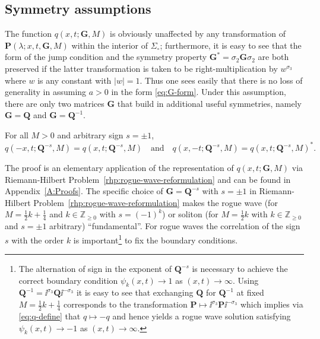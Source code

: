 \subsection{Symmetry assumptions}
The function $q(x,t;\mathbf{G},M)$ is obviously unaffected by any transformation of $\mathbf{P}(\lambda;x,t,\mathbf{G},M)$ within the interior of $\Sigma_\circ$; furthermore, it is easy to see that the form of the jump condition and the symmetry property $\mathbf{G}^*=\sigma_2\mathbf{G}\sigma_2$ are both preserved if the latter transformation is taken to be right-multiplication by $w^{\sigma_3}$ where $w$ is any constant with $|w|=1$.  Thus one sees easily that there is no loss of generality in assuming $a>0$ in the form \eqref{eq:G-form}.  Under this assumption, there are only two matrices $\mathbf{G}$ that build in additional useful symmetries, namely $\mathbf{G}=\mathbf{Q}$ and $\mathbf{G}=\mathbf{Q}^{-1}$.
\begin{proposition}
For all $M>0$ and arbitrary sign $s=\pm 1$,
\begin{equation}
q(-x,t;\mathbf{Q}^{-s},M)=q(x,t;\mathbf{Q}^{-s},M)\quad\text{and}\quad
q(x,-t;\mathbf{Q}^{-s},M)=q(x,t;\mathbf{Q}^{-s},M)^*.
\label{eq:q-symmetries}  
\end{equation}
\label{prop:symmetry}
\end{proposition}
The proof is an elementary application of the representation of $q(x,t;\mathbf{G},M)$ via Riemann-Hilbert Problem~\ref{rhp:rogue-wave-reformulation} and can be found in Appendix~\ref{A:Proofs}.
The specific choice of $\mathbf{G}=\mathbf{Q}^{-s}$ with $s=\pm 1$ in Riemann-Hilbert Problem~\ref{rhp:rogue-wave-reformulation} makes the rogue wave (for $M=\tfrac{1}{2}k+\tfrac{1}{4}$ and $k\in\mathbb{Z}_{\ge 0}$ with $s=(-1)^k$) or soliton (for $M=\tfrac{1}{2}k$ with $k\in\mathbb{Z}_{\ge 0}$ and $s=\pm 1$ arbitrary) ``fundamental''.  For rogue waves the correlation of the sign $s$ with the order $k$ is important\footnote{The alternation of sign in the exponent of $\mathbf{Q}^{-s}$ is necessary to achieve the correct boundary condition $\psi_k(x,t)\to 1$ as $(x,t)\to\infty$.  Using $\mathbf{Q}^{-1}=\ii^{\sigma_3}\mathbf{Q}\ii^{-\sigma_3}$ it is easy to see that exchanging $\mathbf{Q}$ for $\mathbf{Q}^{-1}$ at fixed $M=\tfrac{1}{2}k+\tfrac{1}{4}$ corresponds to the transformation $\mathbf{P}\mapsto \ii^{\sigma_3}\mathbf{P}\ii^{-\sigma_3}$ which implies via \eqref{eq:q-define} that $q\mapsto -q$ and hence yields a rogue wave solution satisfying $\psi_k(x,t)\to -1$ as $(x,t)\to\infty$.} to fix the boundary conditions. 

